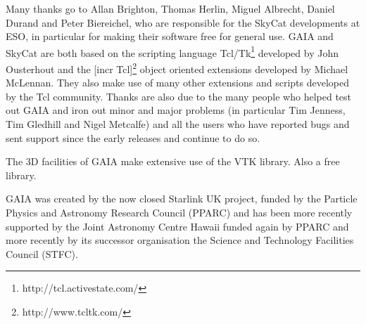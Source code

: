 \documentclass[twoside,11pt]{article}
\newcommand{\htmladdnormallinkfoot}[2]{#1\footnote{#2}}
\newcommand{\htmladdnormallink}[2]{#1}
\renewcommand{\_}{\texttt{\symbol{95}}}
\begin{document}
Many thanks go to Allan Brighton, Thomas Herlin, Miguel Albrecht,
Daniel Durand and Peter Biereichel, who are responsible for the
\htmladdnormallink{SkyCat}{http://archive.eso.org/skycat/}
developments at ESO, in particular for making their software free for
general use.
GAIA and SkyCat are both based on the scripting language
\htmladdnormallinkfoot{Tcl/Tk}{http://tcl.activestate.com/} developed by
John Ousterhout and the \htmladdnormallinkfoot{[incr Tcl]}
{http://www.tcltk.com/} object oriented extensions developed by
Michael McLennan.
They also make use of many other extensions and scripts developed by
the Tcl community.
Thanks are also due to the many people who helped test out GAIA and
iron out minor and major problems (in particular Tim Jenness, Tim
Gledhill and Nigel Metcalfe) and all the users who have reported bugs
and sent support since the early releases and continue to do so.

The 3D facilities of GAIA make extensive use of the 
\htmladdnormallink{VTK}{http://www.kitware.com} library. Also a free
library.

GAIA was created by the now closed Starlink UK project, funded by the Particle
Physics and Astronomy Research Council (PPARC) and has been more recently
supported by the Joint Astronomy Centre Hawaii funded again by PPARC and more
recently by its successor organisation the Science and Technology Facilities
Council (STFC).

\end{document}
